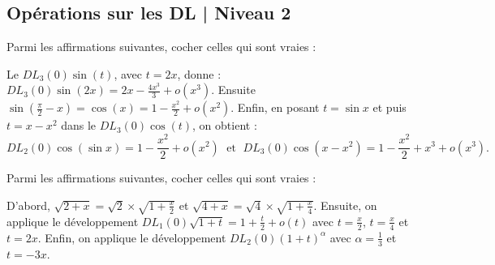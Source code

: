 \subsection{Opérations sur les DL | Niveau 2}

\begin{question}
Parmi les affirmations suivantes, cocher celles qui sont vraies :
\begin{answers}  
\end{answers}
\begin{explanations}
Le $DL_3(0)\sin(t)$, avec $t=2x$, donne : $\displaystyle DL_3(0)\sin (2x)=2x-\frac{4x^3}{3}+o(x^3)$. Ensuite $\displaystyle \sin \left(\frac{\pi}{2}-x\right)=\cos (x)=1-\frac{x^2}{2}+o(x^2)$. Enfin, en posant $t=\sin x$ et puis $t=x-x^2$ dans le $DL_3(0)\cos (t)$, on obtient :
$$\displaystyle DL_2(0)\cos (\sin x)=1-\frac{x^2}{2}+o(x^2)\; \mbox{ et }\; DL_3(0)\cos (x-x^2)=1-\frac{x^2}{2}+x^3+o(x^3).$$
\end{explanations}
\end{question}

\begin{question}
Parmi les affirmations suivantes, cocher celles qui sont vraies :
\begin{answers}
\end{answers}
\begin{explanations}
D'abord, $\displaystyle \sqrt{2+x}=\sqrt{2}\times \sqrt{1+\frac{x}{2}}$ et $\displaystyle \sqrt{4+x}=\sqrt{4}\times \sqrt{1+\frac{x}{4}}$. Ensuite, on applique le développement $\displaystyle DL_1(0)\sqrt{1+t}=1+\frac{t}{2}+o(t)$ avec $\displaystyle t=\frac{x}{2}$, $\displaystyle t=\frac{x}{4}$ et $t=2x$. Enfin, on applique le développement $\displaystyle DL_2(0)(1+t)^{\alpha}$ avec $\displaystyle \alpha =\frac{1}{3}$ et $t=-3x$.
\end{explanations}
\end{question}

